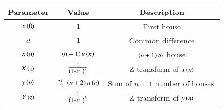 \begin{tabular}{|c|c|c|}
\hline
Parameter & Value & Description \\
\hline
$x\left(0\right)$ & $1$ & First house \\
\hline
$d$ & $1$ & Common difference\\
\hline
$x\left(n\right)$ & $\left(n+1\right)u\left(n\right)$ & $\left(n+1\right)th$ house\\
\hline
$X\left(z\right)$ & $\frac{1}{\left(1-z^{-1}\right)^2}$& Z-transform of $x\left(n\right)$\\
\hline
$y\left(n\right)$ & $\frac{n+1}{2}\left(n+2\right)u\left(n\right)$ & Sum of $n+1$ number of houses.\\
\hline
$Y\left(z\right)$ & $\frac{1}{\left(1-z^{-1}\right)^3}$& Z-transform of $y\left(n\right)$\\
\hline
\end{tabular}
